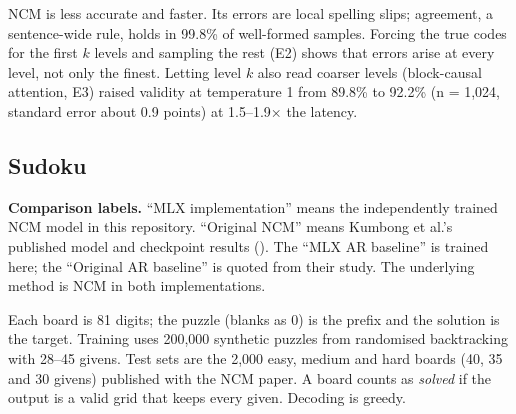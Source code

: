 \documentclass[
  british,
]{article}
\begin{document}
NCM is less accurate and faster. Its errors are local spelling slips;
agreement, a sentence-wide rule, holds in 99.8\% of well-formed samples.
Forcing the true codes for the first \(k\) levels and sampling the rest
(E2) shows that errors arise at every level, not only the finest.
Letting level \(k\) also read coarser levels (block-causal attention,
E3) raised validity at temperature 1 from 89.8\% to 92.2\% (n = 1,024,
standard error about 0.9 points) at 1.5--1.9× the latency.

\subsection{Sudoku}\label{sudoku}

\textbf{Comparison labels.} ``MLX implementation'' means the
independently trained NCM model in this repository. ``Original NCM''
means Kumbong et al.'s published model and checkpoint results
(). The ``MLX AR baseline''
is trained here; the ``Original AR baseline'' is quoted from their
study. The underlying method is NCM in both implementations.

Each board is 81 digits; the puzzle (blanks as 0) is the prefix and the
solution is the target. Training uses 200,000 synthetic puzzles from
randomised backtracking with 28--45 givens. Test sets are the 2,000
easy, medium and hard boards (40, 35 and 30 givens) published with the
NCM paper. A board counts as \emph{solved} if the output is a valid grid
that keeps every given. Decoding is greedy.
\end{document}
